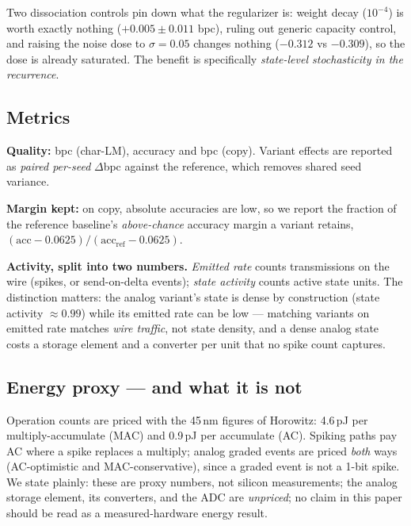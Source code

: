 Two dissociation controls pin down what the regularizer is: weight decay ($10^{-4}$) is worth
exactly nothing ($+0.005 \pm 0.011$ bpc), ruling out generic capacity control, and raising the
noise dose to $\sigma{=}0.05$ changes nothing ($-0.312$ vs $-0.309$), so the dose is already
saturated. The benefit is specifically \emph{state-level stochasticity in the recurrence}.

\subsection{Metrics}
\label{sec:metrics}

\textbf{Quality:} bpc (char-LM), accuracy and bpc (copy). Variant effects are reported as
\emph{paired per-seed} $\Delta$bpc against the reference, which removes shared seed variance.

\textbf{Margin kept:} on copy, absolute accuracies are low, so we report the fraction of the
reference baseline's \emph{above-chance} accuracy margin a variant retains,
$(\mathrm{acc} - 0.0625) / (\mathrm{acc}_{\mathrm{ref}} - 0.0625)$.

\textbf{Activity, split into two numbers.} \emph{Emitted rate} counts transmissions on the
wire (spikes, or send-on-delta events); \emph{state activity} counts active state units. The
distinction matters: the analog variant's state is dense by construction (state activity
$\approx 0.99$) while its emitted rate can be low --- matching variants on emitted rate matches
\emph{wire traffic}, not state density, and a dense analog state costs a storage element and a
converter per unit that no spike count captures.

\subsection{Energy proxy --- and what it is not}
\label{sec:energy}

Operation counts are priced with the 45\,nm figures of Horowitz: 4.6\,pJ per multiply-accumulate
(MAC) and 0.9\,pJ per accumulate (AC). Spiking paths pay AC where a spike replaces a multiply;
analog graded events are priced \emph{both} ways (AC-optimistic and MAC-conservative), since a
graded event is not a 1-bit spike. We state plainly: these are proxy numbers, not silicon
measurements; the analog storage element, its converters, and the ADC are \emph{unpriced}; no
claim in this paper should be read as a measured-hardware energy result.
